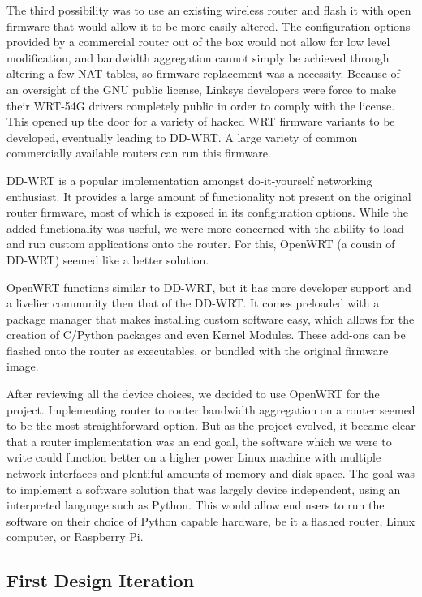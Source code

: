 \documentclass[12pt]{article}
\begin{document}
		The third possibility was to use an existing wireless router and flash it with open firmware that would allow it to be more easily altered. The configuration options provided by a commercial router out of the box would not allow for low level modification, and bandwidth aggregation cannot simply be achieved through altering a few NAT tables, so firmware replacement was a necessity. Because of an oversight of the GNU public license, Linksys developers were force to make their WRT-54G drivers completely public in order to comply with the license. This opened up the door for a variety of hacked WRT firmware variants to be developed, eventually leading to DD-WRT. A large variety of common commercially available routers can run this firmware.

		DD-WRT is a popular implementation amongst do-it-yourself networking enthusiast. It provides a large amount of functionality not present on the original router firmware, most of which is exposed in its configuration options. While the added functionality was useful, we were more concerned with the ability to load and run custom applications onto the router. For this, OpenWRT (a cousin of DD-WRT) seemed like a better solution. 

		OpenWRT functions similar to DD-WRT, but it has more developer support and a livelier community then that of the DD-WRT. It comes preloaded with a package manager that makes installing custom software easy, which allows for the creation of C/Python packages and even Kernel Modules. These add-ons can be flashed onto the router as executables, or bundled with the original firmware image. 

		After reviewing all the device choices, we decided to use OpenWRT for the project. Implementing router to router bandwidth aggregation on a router seemed to be the most straightforward option. But as the project evolved, it became clear that a router implementation was an end goal, the software which we were to write could function better on a higher power Linux machine with multiple network interfaces and plentiful amounts of memory and disk space. The goal was to implement a software solution that was largely device independent, using an interpreted language such as Python. This would allow end users to run the software on their choice of Python capable hardware, be it a flashed router, Linux computer, or Raspberry Pi.

	\subsection{First Design Iteration}
		
\end{document}
